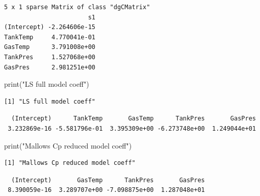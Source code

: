 \documentclass[
  letterpaper,
  DIV=11,
  numbers=noendperiod]{scrartcl}
\newenvironment{Shaded}{\begin{snugshade}}{\end{snugshade}}
\newcommand{\FunctionTok}[1]{\textcolor[rgb]{0.28,0.35,0.67}{#1}}
\newcommand{\NormalTok}[1]{\textcolor[rgb]{0.00,0.23,0.31}{#1}}
\newcommand{\SpecialCharTok}[1]{\textcolor[rgb]{0.37,0.37,0.37}{#1}}
\newcommand{\StringTok}[1]{\textcolor[rgb]{0.13,0.47,0.30}{#1}}
\begin{document}
\begin{verbatim}
5 x 1 sparse Matrix of class "dgCMatrix"
                       s1
(Intercept) -2.264606e-15
TankTemp     4.770041e-01
GasTemp      3.791008e+00
TankPres     1.527068e+00
GasPres      2.981251e+00
\end{verbatim}

\begin{Shaded}
\begin{Highlighting}[]
\FunctionTok{print}\NormalTok{(}\StringTok{"LS full model coeff"}\NormalTok{)}
\end{Highlighting}
\end{Shaded}

\begin{verbatim}
[1] "LS full model coeff"
\end{verbatim}

\begin{Shaded}
\end{Shaded}

\begin{verbatim}
  (Intercept)      TankTemp       GasTemp      TankPres       GasPres 
 3.232869e-16 -5.581796e-01  3.395309e+00 -6.273748e+00  1.249044e+01 
\end{verbatim}

\begin{Shaded}
\begin{Highlighting}[]
\FunctionTok{print}\NormalTok{(}\StringTok{"Mallows Cp reduced model coeff"}\NormalTok{)}
\end{Highlighting}
\end{Shaded}

\begin{verbatim}
[1] "Mallows Cp reduced model coeff"
\end{verbatim}

\begin{Shaded}
\end{Shaded}

\begin{verbatim}
  (Intercept)       GasTemp      TankPres       GasPres 
 8.390059e-16  3.289707e+00 -7.098875e+00  1.287048e+01 
\end{verbatim}
\end{document}
